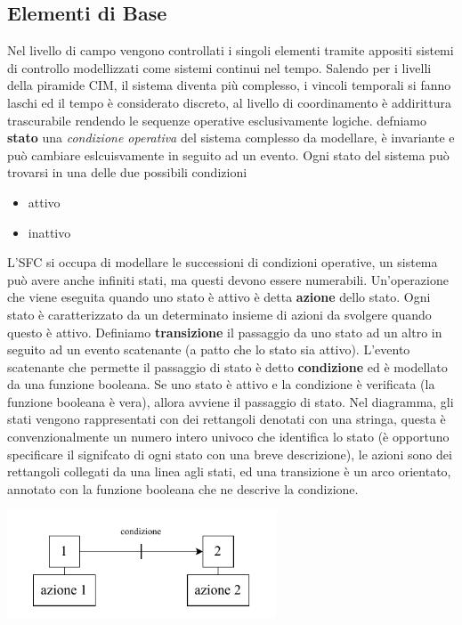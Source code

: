 \documentclass[10pt, letterpaper]{report}
\begin{document}
\subsection{Elementi di Base}
Nel livello di campo vengono controllati i singoli elementi tramite appositi sistemi di controllo modellizzati come sistemi continui nel tempo. Salendo per i livelli della piramide CIM, il sistema diventa più complesso, i vincoli temporali si fanno laschi ed il tempo è considerato discreto, al livello di coordinamento è addirittura trascurabile rendendo le sequenze operative esclusivamente logiche.\acc 
{} defniamo \textbf{stato} una \textit{condizione operativa} del sistema complesso da modellare, è invariante e può cambiare eslcuisvamente in seguito ad un evento. Ogni stato del sistema può trovarsi in una delle due possibili condizioni\begin{itemize}
    \item attivo 
    \item inattivo 
\end{itemize}
L'SFC si occupa di modellare le successioni di condizioni operative, un sistema può avere anche infiniti stati, ma questi devono essere numerabili.\acc 
{} Un'operazione che viene eseguita quando uno stato è attivo è detta \textbf{azione} dello stato. Ogni stato è caratterizzato da un determinato insieme di azioni da svolgere quando questo è attivo.\acc 
{} Definiamo \textbf{transizione} il passaggio da uno stato ad un altro in seguito ad un evento scatenante (a patto che lo stato sia attivo).\acc 
{} L'evento scatenante che permette il passaggio di stato è detto \textbf{condizione} ed è modellato da una funzione booleana. Se uno stato è attivo e la condizione è verificata (la funzione booleana è vera), allora avviene il passaggio di stato.\acc 
Nel diagramma, gli stati vengono rappresentati con dei rettangoli denotati con una stringa, questa è convenzionalmente un numero intero univoco che identifica lo stato (è opportuno specificare il signifcato di ogni stato con una breve descrizione), le azioni sono dei rettangoli collegati da una linea agli stati, ed una transizione è un arco orientato, annotato con la funzione booleana che ne descrive la condizione.\begin{center}
    \includegraphics[width=0.6\textwidth ]{images/SFC.pdf}
\end{center}
\end{document}
